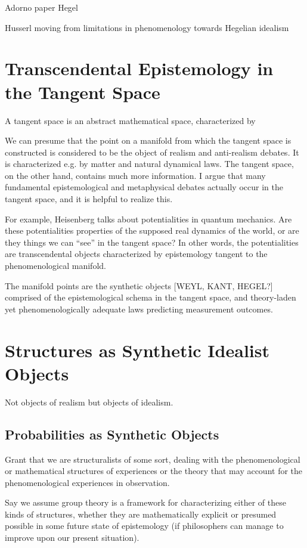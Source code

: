 \documentclass{article}
\begin{document}
Adorno paper
Hegel

Husserl moving from limitations in phenomenology towards Hegelian idealism



\section{Transcendental Epistemology in the Tangent Space}

A tangent space is an abstract mathematical space, characterized by 

We can presume that the point on a manifold from which the tangent space is constructed is considered to be the object of realism and anti-realism debates.  It is characterized e.g. by matter and natural dynamical laws.  The tangent space, on the other hand, contains much more information.  I argue that many fundamental epistemological and metaphysical debates actually occur in the tangent space, and it is helpful to realize this.

For example, Heisenberg talks about potentialities in quantum mechanics.  Are these potentialities properties of the supposed real dynamics of the world, or are they things we can ``see'' in the tangent space?  In other words, the potentialities are transcendental objects characterized by epistemology tangent to the phenomenological manifold.

The manifold points are the synthetic objects [WEYL, KANT, HEGEL?] comprised of the epistemological schema in the tangent space, and theory-laden yet phenomenologically adequate laws predicting measurement outcomes.  

\section{Structures as Synthetic Idealist Objects}

Not objects of realism but objects of idealism.

\subsection{Probabilities as Synthetic Objects}

Grant that we are structuralists of some sort, dealing with the phenomenological or mathematical structures of experiences or the theory that may account for the phenomenological experiences in observation.  

Say we assume group theory is a framework for characterizing either of these kinds of structures, whether they are mathematically explicit or presumed possible in some future state of epistemology (if philosophers can manage to improve upon our present situation).
\end{document}
